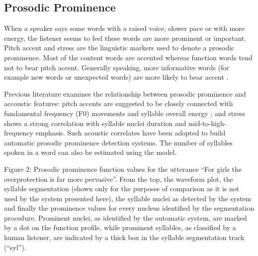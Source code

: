 \subsection{Prosodic Prominence}
When a speaker says some words with a raised voice, slower pace or with more energy, the listener seems to feel these words are more prominent or important. Pitch accent and stress are the linguistic markers used to denote a prosodic prominence. Most of the content words are accented whereas function words tend not to bear pitch accent. Generally speaking, more informative words (for example new words or unexpected words) are more likely to bear accent \citep{Beckman1986, Bagshaw1994}.

Previous literature examines the relationship between prosodic prominence and accoustic features: pitch accents are suggested to be closely connected with fundamental frequency (F0) movements and syllable overall energy \citep{Bagshaw1994, Streefkerk1999, Brenier2005}; and stress shows a strong correlation with syllable nuclei duration and mid-to-high-frequency emphasis\citep{Sluijter1996, Tamburini2003}. Such acoustic correlates have been adopted to build automatic prosodic prominence detection systems\citep{Tamburini2003}. The number of syllables spoken in a word can also be estimated using the \citet{DeJong2009} model. 

Figure 2: Prosodic prominence function values for the utterance “For girls the overprotection is far more pervasive”. From the top, the waveform plot, the syllable segmentation (shown only for the purposes of comparison as it is not used by the system presented here), the syllable nuclei as detected by the system and finally the prominence values for every nucleus identified by the
segmentation procedure. Prominent nuclei, as identified by the automatic system, are marked by a dot on the function profile, while prominent syllables, as classified by a human listener, are indicated by a thick box in the syllable segmentation track (“syl”).



